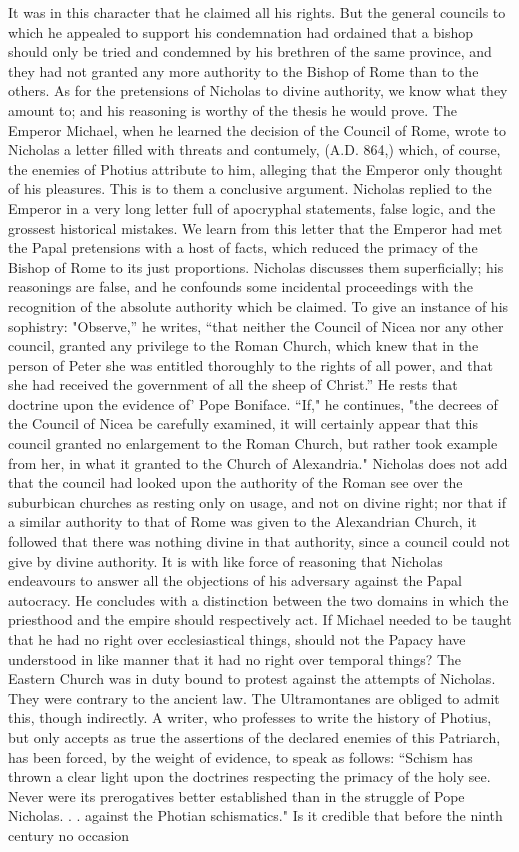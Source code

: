 It was in this character that he claimed all his rights. But the general councils to which he appealed to support his condemnation had ordained that a bishop should only be tried and condemned by his brethren of the same province, and they had not granted any more authority to the Bishop of Rome than to the others. As for the pretensions of Nicholas to divine authority, we know what they amount to; and his reasoning is worthy of the thesis he would prove. The Emperor Michael, when he learned the decision of the Council of Rome, wrote to Nicholas a letter filled with threats and contumely, (A.D. 864,) which, of course, the enemies of Photius attribute to him, alleging that the Emperor only thought of his pleasures. This is to them a conclusive argument. Nicholas replied to the Emperor in a very long letter full of apocryphal statements, false logic, and the grossest historical mistakes. We learn from this letter that the Emperor had met the Papal pretensions with a host of facts, which reduced the primacy of the Bishop of Rome to its just proportions. Nicholas discusses them superficially; his reasonings are false, and he confounds some incidental proceedings with the recognition of the absolute authority which be claimed. To give an instance of his sophistry: "Observe,” he writes, “that neither the Council of Nicea nor any other council, granted any privilege to the Roman Church, which knew that in the person of Peter she was entitled thoroughly to the rights of all power, and that she had received the government of all the sheep of Christ.” He rests that doctrine upon the evidence of' Pope Boniface. “If," he continues, "the decrees of the Council of Nicea be carefully examined, it will certainly appear that this council granted no enlargement to the Roman Church, but rather took example from her, in what it granted to the Church of Alexandria." Nicholas does not add that the council had looked upon the authority of the Roman see over the suburbican churches as resting only on usage, and not on divine right; nor that if a similar authority to that of Rome was given to the Alexandrian Church, it followed that there was nothing divine in that authority, since a council could not give by divine authority. It is with like force of reasoning that Nicholas endeavours to answer all the objections of his adversary against the Papal autocracy. He concludes with a distinction between the two domains in which the priesthood and the empire should respectively act. If Michael needed to be taught that he had no right over ecclesiastical things, should not the Papacy have understood in like manner that it had no right over temporal things? The Eastern Church was in duty bound to protest against the attempts of Nicholas. They were contrary to the ancient law. The Ultramontanes are obliged to admit this, though indirectly. A writer, who professes to write the history of Photius, but only accepts as true the assertions of the declared enemies of this Patriarch, has been forced, by the weight of evidence, to speak as follows: “Schism has thrown a clear light upon the doctrines respecting the primacy of the holy see. Never were its prerogatives better established than in the struggle of Pope Nicholas. . . against the Photian schismatics." Is it credible that before the ninth century no occasion 